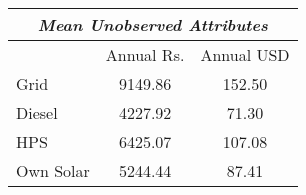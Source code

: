 \begin{table}[htbp]\centering
\def\sym#1{\ifmmode^{#1}\else\(^{#1}\)\fi}
\begin{tabular}{l*{1}{cc}}
\toprule
  \multicolumn{3}{c}{\textit{Mean Unobserved Attributes}}\\
\midrule
& Annual Rs. & Annual USD \\
Grid                &      9149.86& 152.50\\
Diesel              &       4227.92& 71.30\\
HPS                 &       6425.07& 107.08\\
Own Solar           &     5244.44& 87.41\\
\bottomrule
\end{tabular}
\end{table}